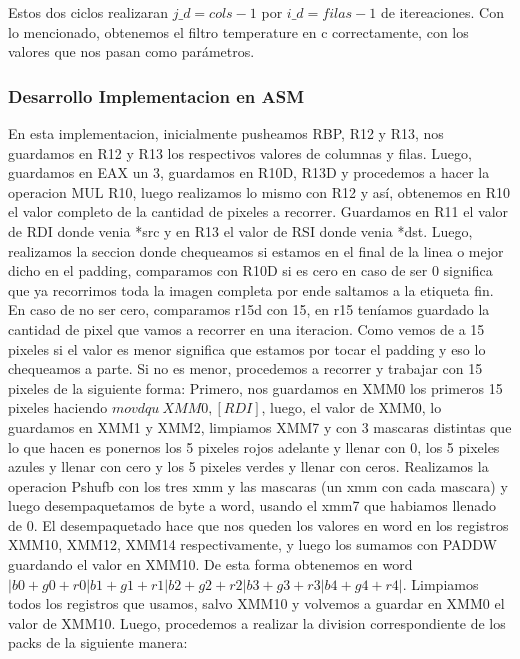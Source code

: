Estos dos ciclos realizaran $j\_d = cols - 1$  por $i\_d = filas -1$ de itereaciones.\newline
Con lo mencionado, obtenemos el filtro temperature en c correctamente, con los valores que nos pasan como parámetros.\newline

\vspace*{0.3cm} \noindent
\subsubsection{Desarrollo Implementacion en ASM}
En esta implementacion, inicialmente pusheamos RBP, R12 y R13, nos guardamos en R12 y R13 los respectivos valores de columnas y filas.\newline
Luego, guardamos en EAX un 3, guardamos en R10D, R13D y procedemos a hacer la operacion MUL R10, luego realizamos lo mismo con R12 y así,
obtenemos en R10 el valor completo de la cantidad de pixeles a recorrer.\newline
Guardamos en R11 el valor de RDI donde venia *src y en R13 el valor de RSI donde venia *dst. \newline
Luego, realizamos la seccion donde chequeamos si estamos en el final de la linea o mejor dicho en el padding, comparamos con R10D si es cero \newline
en caso de ser 0 significa que ya recorrimos toda la imagen completa por ende saltamos a la etiqueta fin. \newline
En caso de no ser cero, comparamos r15d con 15, en r15 teníamos guardado la cantidad de pixel que vamos a recorrer en una iteracion.
Como vemos de a 15 pixeles si el valor es menor significa que estamos por tocar el padding y eso lo chequeamos a parte. \newline
Si no es menor, procedemos a recorrer y trabajar con 15 pixeles de la siguiente forma: \newline
Primero, nos guardamos en XMM0 los primeros 15 pixeles haciendo $ movdqu\  XMM0, [RDI]$, luego, el valor de XMM0,
lo guardamos en XMM1 y XMM2, limpiamos XMM7 y con 3 mascaras distintas que lo que hacen es ponernos los 5 pixeles rojos adelante y llenar con 0, 
los 5 pixeles azules y llenar con cero y los 5 pixeles verdes y llenar con ceros. \newline
Realizamos la operacion Pshufb con los tres xmm y las mascaras (un xmm con cada mascara) y luego desempaquetamos de byte a word,
usando el xmm7 que habiamos llenado de 0. \newline
El desempaquetado hace que nos queden los valores en word en los registros XMM10, XMM12, XMM14 respectivamente, y luego
los sumamos con PADDW guardando el valor en XMM10. De esta forma obtenemos en word 
$|b0 + g0 + r0|b1 + g1 + r1|b2 + g2 + r2|b3 + g3 + r3|b4 + g4 + r4|$. \newline
Limpiamos todos los registros que usamos, salvo XMM10 y volvemos a guardar en XMM0 el valor de XMM10. Luego, procedemos
a realizar la division correspondiente de los packs de la siguiente manera:\newline

